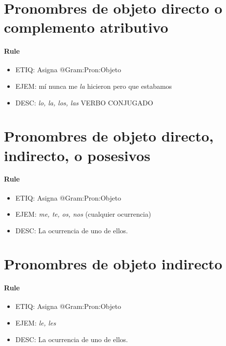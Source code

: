 \documentclass[11pt]{report}
\begin{document}
\section{Pronombres de objeto directo o complemento atributivo}
\paragraph*{Rule}
\begin{itemize}
\item ETIQ: Asigna @Gram:Pron:Objeto
\item EJEM: mí nunca me \emph{la} hicieron pero que estabamos
\item DESC: \emph{lo, la, los, las} VERBO CONJUGADO
\end{itemize}

\section{Pronombres de objeto directo, indirecto, o posesivos}
\paragraph*{Rule}
\begin{itemize}
\item ETIQ: Asigna @Gram:Pron:Objeto
\item EJEM: \emph{me, te, os, nos} (cualquier ocurrencia)
\item DESC: La ocurrencia de uno de ellos.
\end{itemize}

\section{Pronombres de objeto indirecto}
\paragraph*{Rule}
\begin{itemize}
\item ETIQ: Asigna @Gram:Pron:Objeto
\item EJEM: \emph{le, les}
\item DESC: La ocurrencia de uno de ellos.
\end{itemize}
\end{document}
